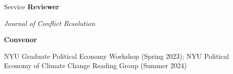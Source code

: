 \documentclass{resume} %
\begin{document}
\newpage
\begin{rSection}{Service}
    \textbf{Reviewer}

    \hspace*{0.5em} \textit{Journal of Conflict Resolution}

    \textbf{Convenor}

    \hspace*{0.5em} NYU Graduate Political Economy Workshop (Spring 2023); NYU Political Economy of Climate Change Reading Group (Summer 2024)
    
\end{rSection}
\end{document}
